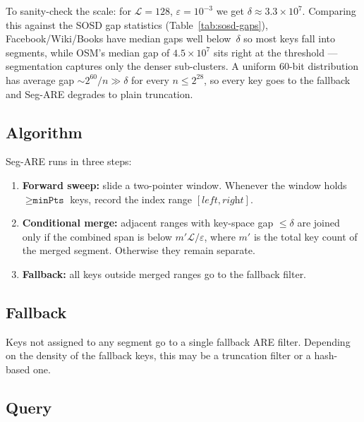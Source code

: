 To sanity-check the scale: for $\mathcal{L} = 128$, $\varepsilon = 10^{-3}$ we get
$\delta \approx 3.3 \times 10^{7}$. Comparing this against the SOSD gap statistics
(Table~\ref{tab:sosd-gaps}), Facebook/Wiki/Books have median gaps well below~$\delta$
so most keys fall into segments, while OSM's median gap of $4.5 \times 10^{7}$ sits
right at the threshold --- segmentation captures only the denser sub-clusters.
A uniform 60-bit distribution has average gap ${\sim}2^{60}/n \gg \delta$
for every $n \leq 2^{28}$, so every key goes to the fallback and Seg-ARE
degrades to plain truncation.

\subsection{Algorithm}

Seg-ARE runs in three steps:

\begin{enumerate}
    \item \textbf{Forward sweep:} slide a two-pointer window. Whenever the window holds
    $\geq \texttt{minPts}$ keys, record the index range $[\textit{left}, \textit{right}]$.
    \item \textbf{Conditional merge:} adjacent ranges with key-space gap $\leq \delta$ are
    joined only if the combined span is below $m'\mathcal{L}/\varepsilon$,
    where $m'$ is the total key count of the merged segment. Otherwise they remain separate.
    \item \textbf{Fallback:} all keys outside merged ranges go to the fallback filter.
\end{enumerate}

\subsection{Fallback}

Keys not assigned to any segment go to a single fallback ARE filter.
Depending on the density of the fallback keys, this may be a truncation filter
or a hash-based one.

\subsection{Query}\label{subsec:query}

